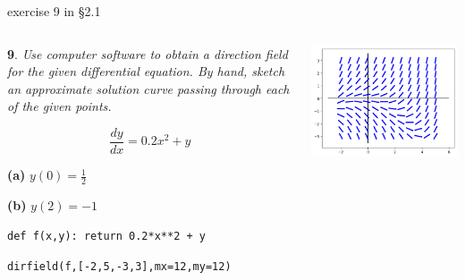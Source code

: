 \documentclass[colorlinks]{beamer}
\begin{document}
\begin{frame}{exercise 9 in \S 2.1}

\begin{columns}
\begin{column}{0.45\textwidth}
\small
\noindent \textbf{9}.  \emph{Use computer software to obtain a direction field for the given differential equation.  By hand, sketch an approximate solution curve passing through each of the given points.}

$$\frac{dy}{dx} = 0.2 x^2 + y$$

\noindent \textbf{(a)} \quad $y(0)=\tfrac{1}{2}$

\noindent \textbf{(b)} \quad $y(2)=-1$

\vspace{15mm}

\scriptsize
\texttt{def f(x,y):  return 0.2*x**2 + y}

\texttt{dirfield(f,[-2,5,-3,3],mx=12,my=12)}
\end{column}
\begin{column}{0.55\textwidth}

\hspace{-10mm} \includegraphics[width=1.15\textwidth]{figs/exercise-9-2-1}
\end{column}
\end{columns}
\end{frame}
\end{document}

